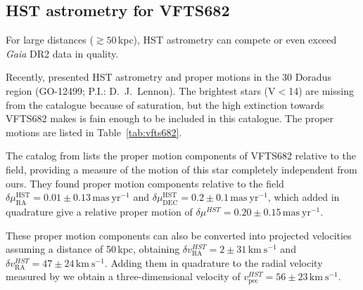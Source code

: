 \documentclass[apjl,twocolumn]{emulateapj}
\newcommand{\kms}{{\,\mathrm{km\ s^{-1}}}}
\DeclareRobustCommand{\Tabref}[1]{Table~\ref{#1}}
\begin{document}

\subsection{HST astrometry for VFTS682}
For large distances ($\gtrsim50$\,kpc), HST astrometry can compete or even exceed \emph{Gaia} DR2 data in quality.

Recently, \citet{platais:18} presented HST astrometry and proper motions in the 30 Doradus region (GO-12499; P.I.: D.~J.~Lennon). The brightest stars (V$<$14) are missing from the catalogue because of saturation, but the high extinction towards VFTS682 makes is fain enough to be included in this catalogue. The  proper motions are
listed in \Tabref{tab:vfts682}. 


The catalog from \citet{platais:18} lists the proper motion
components of VFTS682 relative to the field, providing a
measure of the motion of this star completely independent from
ours. They found proper
motion components relative to the field
$\delta\mu_\mathrm{RA}^\mathrm{HST} = 0.01\pm0.13\,\mathrm{mas\
  yr^{-1}}$ and
$\delta\mu_\mathrm{DEC}^\mathrm{HST}=0.2\pm0.1\,\mathrm{mas\
  yr^{-1}}$, which added in quadrature give a relative proper motion of
$\delta \mu^{HST} =0.20 \pm 0.15\,\mathrm{mas\ yr^{-1}}$.

These proper motion components can also be converted into projected
velocities assuming a distance of 50\,kpc, obtaining $\delta
v_\mathrm{RA}^{HST}=2\pm31\kms$ and $\delta
v_\mathrm{RA}^{HST}=47\pm24\kms$. %
Adding them in quadrature to the radial velocity
measured by \citet{bestenlehner:11} we obtain a three-dimensional velocity of
$v_\mathrm{pec}^{HST}=56 \pm 23  \kms$.
\end{document}
